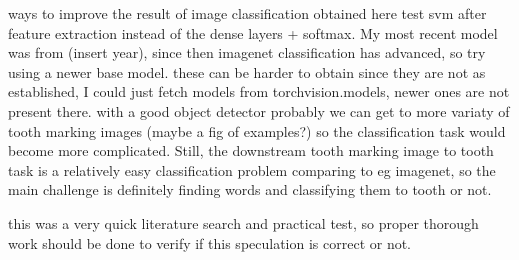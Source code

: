 \documentclass{article}
\begin{document}
ways to improve the result of image classification obtained here 
test svm after feature extraction instead of the dense layers + softmax. My most recent model was from (insert year),
since then imagenet classification has advanced, so try using a newer base model. these can be harder to obtain 
since they are not as established, I could just fetch models from torchvision.models, newer ones are not present there.
with a good object detector probably we can get to more variaty of tooth marking images (maybe a fig of examples?)
so the classification task would become more complicated. Still, the downstream tooth marking image to tooth task 
is a relatively easy classification problem comparing to eg imagenet, so the main challenge is definitely finding words and
classifying them to tooth or not.

this was a very quick literature search and practical test, so proper thorough work should be done to verify if this speculation 
is correct or not.

\printbibliography
\end{document}
